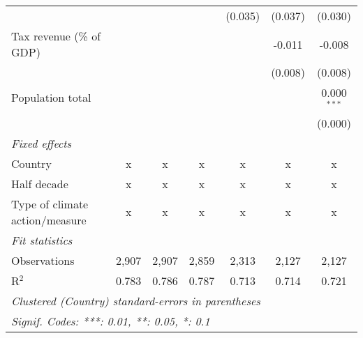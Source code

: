 \begin{tabular}{lcccccc}
                                                      &                &                &                & (0.035)       & (0.037)        & (0.030)\\   
   Tax revenue (\% of GDP)                            &                &                &                &               & -0.011         & -0.008\\   
                                                      &                &                &                &               & (0.008)        & (0.008)\\   
   Population total                                   &                &                &                &               &                & 0.000$^{***}$\\   
                                                      &                &                &                &               &                & (0.000)\\   
   \emph{Fixed effects}\\
   Country                                            & x              & x              & x              & x             & x              & x\\  
   Half decade                                        & x              & x              & x              & x             & x              & x\\  
   Type of climate action/measure                     & x              & x              & x              & x             & x              & x\\  
   \midrule \emph{Fit statistics}\\
   Observations                                       & 2,907          & 2,907          & 2,859          & 2,313         & 2,127          & 2,127\\  
   R$^2$                                              & 0.783          & 0.786          & 0.787          & 0.713         & 0.714          & 0.721\\  
   \midrule
   \multicolumn{7}{l}{\emph{Clustered (Country) standard-errors in parentheses}}\\
   \multicolumn{7}{l}{\emph{Signif. Codes: ***: 0.01, **: 0.05, *: 0.1}}\\
\end{tabular}
\par\endgroup


